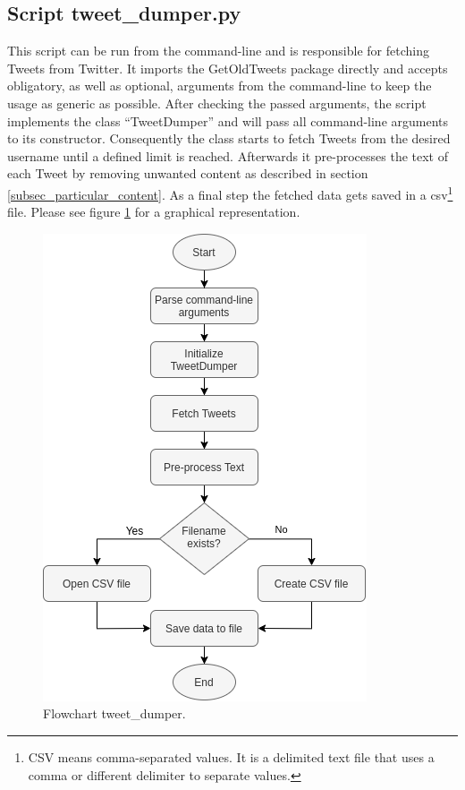 \documentclass[conference]{IEEEtran}
\begin{document}
\subsection{Script tweet\_dumper.py}

This script can be run from the command-line and is responsible for fetching Tweets from Twitter. It imports the GetOldTweets package directly and accepts obligatory, as well as optional, arguments from the command-line to keep the usage as generic as possible. After checking the passed arguments, the script implements the class ``TweetDumper'' and will pass all command-line arguments to its constructor. Consequently the class starts to fetch Tweets from the desired username until a defined limit is reached. Afterwards it pre-processes the text of each Tweet by removing unwanted content as described in section \ref{subsec_particular_content}. As a final step the fetched data gets saved in a csv\footnote{CSV means comma-separated values. It is a delimited text file that uses a comma or different delimiter to separate values.} file. Please see figure \ref{fig:flowchart_tweet_dumper} for a graphical representation.

\begin{figure}[htbp]
\centerline{\includegraphics[scale=0.61]{pictures/flowchart_tweet_dumper.png}}
\caption{Flowchart tweet\_dumper.}
\label{fig:flowchart_tweet_dumper}
\end{figure}
\end{document}
